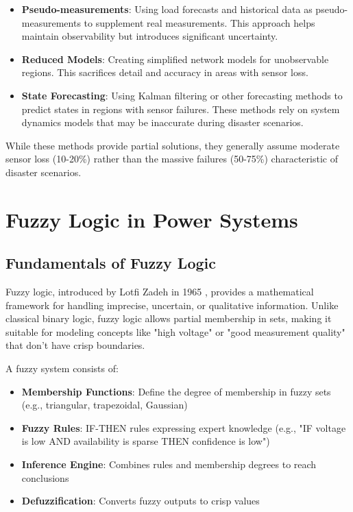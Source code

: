 \documentclass[12pt,a4paper]{report}
\begin{document}
\begin{itemize}
    \item \textbf{Pseudo-measurements}: Using load forecasts and historical data as pseudo-measurements to supplement real measurements. This approach helps maintain observability but introduces significant uncertainty.
    
    \item \textbf{Reduced Models}: Creating simplified network models for unobservable regions. This sacrifices detail and accuracy in areas with sensor loss.
    
    \item \textbf{State Forecasting}: Using Kalman filtering or other forecasting methods to predict states in regions with sensor failures. These methods rely on system dynamics models that may be inaccurate during disaster scenarios.
\end{itemize}

While these methods provide partial solutions, they generally assume moderate sensor loss (10-20\%) rather than the massive failures (50-75\%) characteristic of disaster scenarios.

\section{Fuzzy Logic in Power Systems}

\subsection{Fundamentals of Fuzzy Logic}

Fuzzy logic, introduced by Lotfi Zadeh in 1965 \cite{zadeh1965}, provides a mathematical framework for handling imprecise, uncertain, or qualitative information. Unlike classical binary logic, fuzzy logic allows partial membership in sets, making it suitable for modeling concepts like "high voltage" or "good measurement quality" that don't have crisp boundaries.

A fuzzy system consists of:
\begin{itemize}
    \item \textbf{Membership Functions}: Define the degree of membership in fuzzy sets (e.g., triangular, trapezoidal, Gaussian)
    \item \textbf{Fuzzy Rules}: IF-THEN rules expressing expert knowledge (e.g., "IF voltage is low AND availability is sparse THEN confidence is low")
    \item \textbf{Inference Engine}: Combines rules and membership degrees to reach conclusions
    \item \textbf{Defuzzification}: Converts fuzzy outputs to crisp values
\end{itemize}
\end{document}
